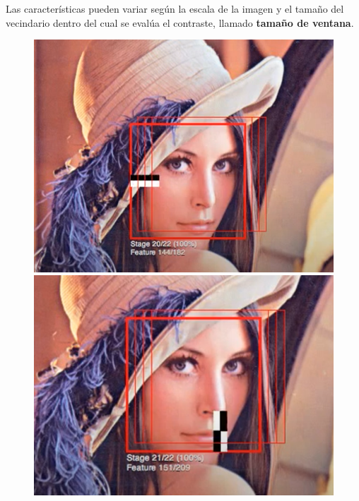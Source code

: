 \documentclass[a4paper]{article}
\begin{document}
Las características pueden variar según la escala de la imagen y el tamaño del vecindario dentro del cual se evalúa el contraste, llamado \textbf{tamaño de ventana}. 

\begin{figure}[H]
    \centering
    \begin{minipage}[b]{0.32\textwidth}
        \includegraphics[width=\textwidth]{../img/hf1.png}
    \end{minipage}
    \hfill
    \begin{minipage}[b]{0.32\textwidth}
        \includegraphics[width=\textwidth]{../img/hf2.png}
    \end{minipage}
    \hfill
    \begin{minipage}[b]{0.32\textwidth}

\end{minipage}
\end{figure}
\end{document}
